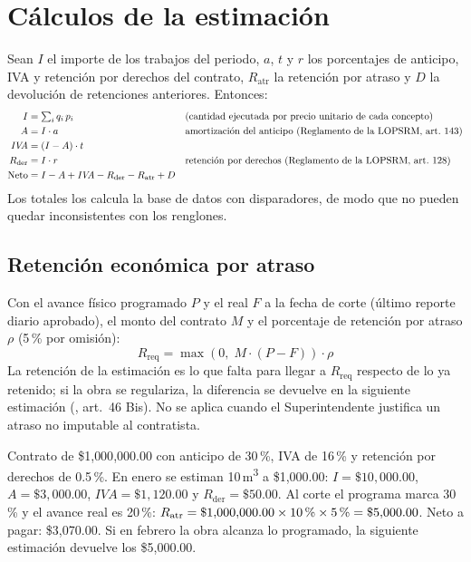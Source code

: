 \section{Cálculos de la estimación}
Sean $I$ el importe de los trabajos del periodo, $a$, $t$ y $r$ los porcentajes de anticipo, IVA y retención por derechos del contrato, $R_{\text{atr}}$ la retención por atraso y $D$ la devolución de retenciones anteriores. Entonces:
\begin{align*}
I &= \textstyle\sum_{i} q_i \, p_i & &\text{(cantidad ejecutada por precio unitario de cada concepto)}\\
A &= I \cdot a & &\text{amortización del anticipo (Reglamento de la LOPSRM, art.~143)}\\
\mathit{IVA} &= (I - A)\cdot t\\
R_{\text{der}} &= I \cdot r & &\text{retención por derechos (Reglamento de la LOPSRM, art.~128)}\\
\text{Neto} &= I - A + \mathit{IVA} - R_{\text{der}} - R_{\text{atr}} + D
\end{align*}
Los totales los calcula la base de datos con disparadores, de modo que no pueden quedar inconsistentes con los renglones.

\subsection{Retención económica por atraso}
Con el avance físico programado $P$ y el real $F$ a la fecha de corte (último reporte diario aprobado), el monto del contrato $M$ y el porcentaje de retención por atraso $\rho$ (5\,\% por omisión):
\[ R_{\text{req}} = \max(0,\; M \cdot (P - F)) \cdot \rho \]
La retención de la estimación es lo que falta para llegar a $R_{\text{req}}$ respecto de lo ya retenido; si la obra se regulariza, la diferencia se devuelve en la siguiente estimación (\ley, art.~46 Bis). No se aplica cuando el Superintendente justifica un atraso no imputable al contratista.

\begin{aclaracion}[Ejemplo]
Contrato de \$1{,}000{,}000.00 con anticipo de 30\,\%, IVA de 16\,\% y retención por derechos de 0.5\,\%. En enero se estiman 10\,m\textsuperscript{3} a \$1{,}000.00: $I = \$10{,}000.00$, $A = \$3{,}000.00$, $\mathit{IVA} = \$1{,}120.00$ y $R_{\text{der}} = \$50.00$. Al corte el programa marca 30\,\% y el avance real es 20\,\%: $R_{\text{atr}} = \$1{,}000{,}000.00 \times \text{10\,\%} \times \text{5\,\%} = \$5{,}000.00$. Neto a pagar: \$3{,}070.00. Si en febrero la obra alcanza lo programado, la siguiente estimación devuelve los \$5{,}000.00.
\end{aclaracion}

